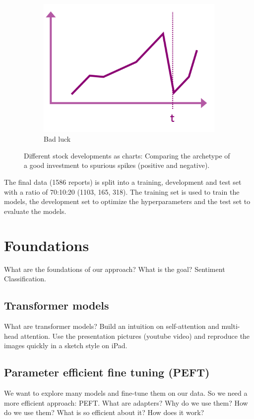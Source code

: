 \documentclass[conference]{IEEEtran}
\begin{document}
\begin{figure}[h!]
\begin{subfigure}{.33\linewidth}
        \centering
        \includegraphics[width=\linewidth]{../5. report/pictures/preproccessing3.png}
        \caption{Bad luck}
        \label{fig:preprocessing3}
    \end{subfigure}
    \caption{Different stock developments as charts: Comparing the archetype of a good investment to spurious spikes (positive and negative). }
    \label{fig:preprocessing}
\end{figure}

The final data (1586 reports) is split into a training, development and test set with a ratio of 70:10:20 (1103, 165, 318). The training set is used to train the models, the development set to optimize the hyperparameters and the test set to evaluate the models.
\section{Foundations} %
What are the foundations of our approach? What is the goal? Sentiment Classification.
\subsection{Transformer models}%
What are transformer models? 
Build an intuition on self-attention and multi-head attention. 
Use the presentation pictures (youtube video) and reproduce the images quickly in a sketch style on iPad.
\subsection{Parameter efficient fine tuning (PEFT)}%
We want to explore many models and fine-tune them on our data. So we need a more efficient approach: PEFT.
What are adapters? Why do we use them? How do we use them?
What is so efficient about it? How does it work?
\cite{Poth2023}
\end{document}

